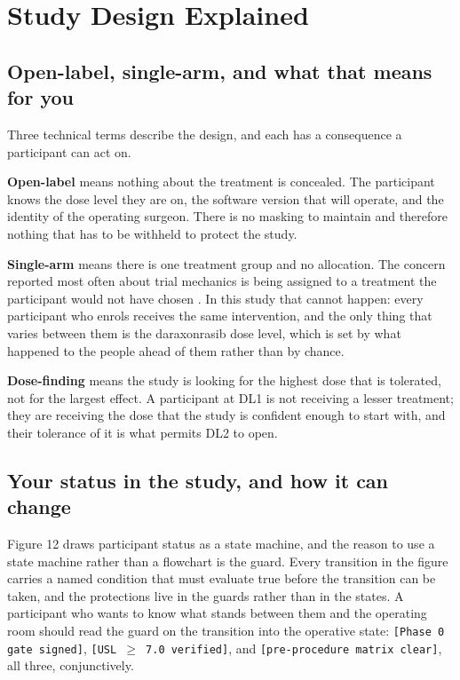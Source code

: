 \section{Study Design Explained}

\subsection{Open-label, single-arm, and what that means for you}

Three technical terms describe the design, and each has a consequence a
participant can act on.

\textbf{Open-label} means nothing about the treatment is concealed. The
participant knows the dose level they are on, the software version that will
operate, and the identity of the operating surgeon. There is no masking to
maintain and therefore nothing that has to be withheld to protect the study.

\textbf{Single-arm} means there is one treatment group and no allocation. The
concern reported most often about trial mechanics is being assigned to a
treatment the participant would not have chosen \cite{NCITrial2024,
WuSemiAI2026}. In this study that cannot happen: every participant who enrols
receives the same intervention, and the only thing that varies between them is
the daraxonrasib dose level, which is set by what happened to the people ahead
of them rather than by chance.

\textbf{Dose-finding} means the study is looking for the highest dose that is
tolerated, not for the largest effect. A participant at DL1 is not receiving a
lesser treatment; they are receiving the dose that the study is confident enough
to start with, and their tolerance of it is what permits DL2 to open.

\subsection{Your status in the study, and how it can change}

Figure 12 draws participant status as a state machine, and the reason to use a
state machine rather than a flowchart is the guard. Every transition in the
figure carries a named condition that must evaluate true before the transition
can be taken, and the protections live in the guards rather than in the states.
A participant who wants to know what stands between them and the operating room
should read the guard on the transition into the operative state:
\texttt{[Phase 0 gate signed]}, \texttt{[USL $\geq$ 7.0 verified]}, and
\texttt{[pre-procedure matrix clear]}, all three, conjunctively.

